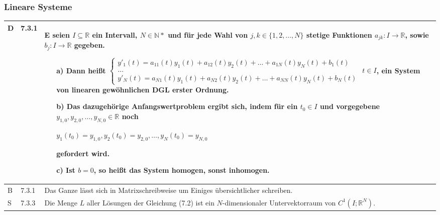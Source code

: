 \subsubsection{Lineare Systeme}

    \begin{longtable}{p{0.75cm} p{1cm} p{16cm}}
        \toprule

        D   & 7.3.1 &   E seien $I \subseteq  \mathbb{R}$ ein Intervall, $N \in \mathbb{N*}$ und für jede Wahl von $j,k \in \{1,2,\dots,N\}$ 
                        stetige Funktionen $a_{jk}: I \rightarrow \mathbb{R}$, sowie $b_j: I \rightarrow \mathbb{R}$ gegeben. 
                        \begin{itemize}[topsep=-0.5cm]
                            \item[a)] Dann heißt \hfill \break
                                        $\begin{cases}
                                            y'_1(t) = a_{11}(t)y_1(t) + a_{12}(t)y_2(t) + \dots + a_{1N}(t)y_N(t) + b_1(t) \\
                                            \dots \\
                                            y'_N(t) = a_{N1}(t)y_1(t) + a_{N2}(t) y_2(t) + \dots + a_{NN}(t)y_N(t) + b_N(t)
                                        \end{cases}$
                                        $t\in I$, ein \textbf{System von linearen gewöhnlichen DGL erster Ordnung.}
                            \item[b)] Das dazugehörige Anfangswertproblem ergibt sich, indem für ein $t_0 \in I$ und vorgegebene
                                        $y_{1,0},y_{2,0},\dots,y_{N,0} \in \mathbb{R}$ noch \hfill \break
                                        \centerline{$ y_1(t_0) = y_{1,0}, y_2(t_0) = y_{2,0}, \dots, y_N(t_0)=y_{N,0} $}
                                        gefordert wird.
                            \item[c)] Ist $b= 0$, so heißt das System homogen, sonst inhomogen.
                        \end{itemize} \vspace{-0cm} \\
        \midrule
        B   & 7.3.1 &   Das Ganze lässt sich in Matrixschreibweise um Einiges übersichtlicher schreiben. \\
        \midrule
        S   & 7.3.3 &   Die Menge $L$ aller Lösungen der Gleichung (7.2) ist ein $N$-dimensionaler Untervektorraum von $C^1(I; \mathbb{R}^N)$. \\

\end{longtable}
